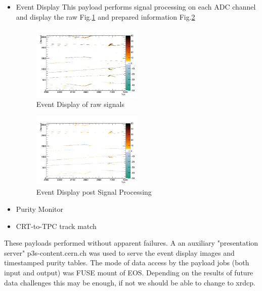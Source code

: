 \documentclass[pdftex,12pt,letter]{article}
\begin{document}
\begin{itemize}
\item Event Display
This payload performs signal processing on each ADC channel and display the raw Fig.\ref{fig:adcraw} and prepared information 
 Fig.\ref{fig:adcprep}

\begin{figure}[tbh]
  \centering
  \includegraphics[width=0.5\textwidth]{./ReportImages/adcraw_evt1661_ch0-2559.png}
  \caption{Event Display of raw signals}
  \label{fig:adcraw}
\end{figure}


\begin{figure}[tbh]
  \centering
  \includegraphics[width=0.5\textwidth]{./ReportImages/adcprep_evt1661_ch0-2559.png}
  \caption{Event Display post Signal Processing}
  \label{fig:adcprep}
\end{figure}

\item Purity Monitor
\item CRT-to-TPC track match
\end{itemize}
 


These payloads performed without apparent failures. A an auxiliary "presentation server" p3s-content.cern.ch was used to serve the event display images and timestamped purity tables.
The mode of data access by the payload jobs (both input and output) was FUSE mount of EOS. Depending on the results of future data challenges this may be enough, if not we should be able to change to xrdcp.
\end{document}
